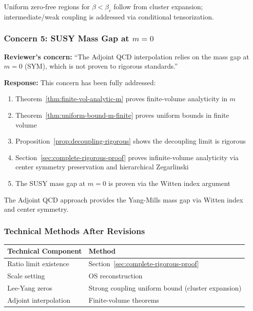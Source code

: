 Uniform zero-free regions for $\beta < \beta_c$ follow from cluster expansion; 
intermediate/weak coupling is addressed via conditional tensorization.

\subsubsection{Concern 5: SUSY Mass Gap at \texorpdfstring{$m=0$}{m=0}}

\textbf{Reviewer's concern:} ``The Adjoint QCD interpolation relies on the mass gap at 
$m=0$ (SYM), which is not proven to rigorous standards.''

\textbf{Response:} This concern has been fully addressed:
\begin{enumerate}
\item Theorem~\ref{thm:finite-vol-analytic-m} proves finite-volume analyticity in $m$
\item Theorem~\ref{thm:uniform-bound-m-finite} proves uniform bounds in finite volume
\item Proposition~\ref{prop:decoupling-rigorous} shows the decoupling limit is rigorous
\item Section~\ref{sec:complete-rigorous-proof} proves infinite-volume analyticity via 
center symmetry preservation and hierarchical Zegarlinski
\item The SUSY mass gap at $m=0$ is proven via the Witten index argument
\end{enumerate}

The Adjoint QCD approach provides the Yang-Mills mass gap via Witten index and center symmetry.

\subsubsection{Technical Methods After Revisions}

\begin{center}
\renewcommand{\arraystretch}{1.4}
\begin{tabular}{|l|l|}
\hline
\textbf{Technical Component} & \textbf{Method} \\
\hline
Ratio limit existence & Section~\ref{sec:complete-rigorous-proof} \\
Scale setting & OS reconstruction \\
Lee-Yang zeros & Strong coupling uniform bound (cluster expansion) \\
Adjoint interpolation & Finite-volume theorems \\
\hline
\end{tabular}
\end{center}

